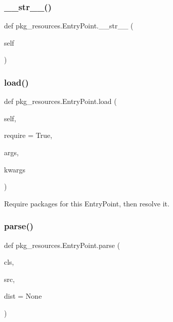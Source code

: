 \subsubsection{\texorpdfstring{\+\_\+\+\_\+str\+\_\+\+\_\+()}{\_\_str\_\_()}}
{\footnotesize\ttfamily def pkg\+\_\+resources.\+Entry\+Point.\+\_\+\+\_\+str\+\_\+\+\_\+ (\begin{DoxyParamCaption}\item[{}]{self }\end{DoxyParamCaption})}

\mbox{\label{classpkg__resources_1_1EntryPoint_a5438200cf3226e4762a3b94a456be23a}} 
\subsubsection{\texorpdfstring{load()}{load()}}
{\footnotesize\ttfamily def pkg\+\_\+resources.\+Entry\+Point.\+load (\begin{DoxyParamCaption}\item[{}]{self,  }\item[{}]{require = {\ttfamily True},  }\item[{}]{args,  }\item[{}]{kwargs }\end{DoxyParamCaption})}

\begin{DoxyVerb}Require packages for this EntryPoint, then resolve it.
\end{DoxyVerb}
 \mbox{\label{classpkg__resources_1_1EntryPoint_a3b155a03ae9e3e5f722c8258ddcec0cd}} 
\subsubsection{\texorpdfstring{parse()}{parse()}}
{\footnotesize\ttfamily def pkg\+\_\+resources.\+Entry\+Point.\+parse (\begin{DoxyParamCaption}\item[{}]{cls,  }\item[{}]{src,  }\item[{}]{dist = {\ttfamily None} }\end{DoxyParamCaption})}

